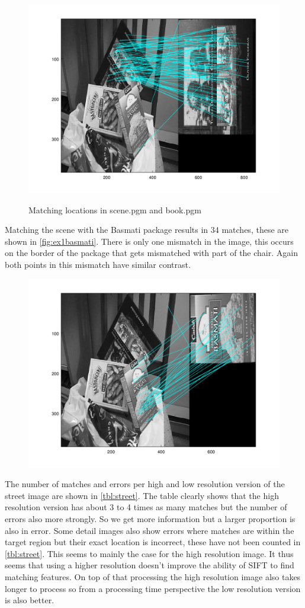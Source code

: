 \documentclass[a4paper]{article}
\begin{document}
\begin{figure}[h]
	\centering
	\includegraphics[width=.7\textwidth]{ex1match}
	\label{fig:ex1match}
	\caption{Matching locations in scene.pgm and book.pgm}
\end{figure}

Matching the scene with the Basmati package results in 34 matches, these are shown in \autoref{fig:ex1basmati}. There is only one mismatch in the image, this occurs on the border of the package that gets mismatched with part of the chair. Again both points in this mismatch have similar contrast.

\begin{figure}[h]
	\centering
	\includegraphics[width=.7\textwidth]{ex1basmati}
	\label{fig:ex1basmati}
	\caption{}
\end{figure}

The number of matches and errors per high and low resolution version of the street image are shown in \autoref{tbl:street}. The table clearly shows that the high resolution version has about 3 to 4 times as many matches but the number of errors also more strongly. So we get more information but a larger proportion is also in error. Some detail images also show errors where matches are within the target region but their exact location is incorrect, these have not been counted in \autoref{tbl:street}. This seems to mainly the case for the high resolution image. It thus seems that using a higher resolution doesn't improve the ability of SIFT to find matching features. On top of that processing the high resolution image also takes longer to process so from a processing time perspective the low resolution version is also better.
\end{document}
